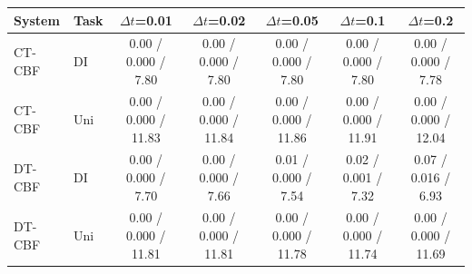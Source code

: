 \begin{tabular}{llccccc}
\hline
System & Task & $\Delta t$=0.01 & $\Delta t$=0.02 & $\Delta t$=0.05 & $\Delta t$=0.1 & $\Delta t$=0.2 \\
\hline
CT-CBF & DI & 0.00 / 0.000 / 7.80 & 0.00 / 0.000 / 7.80 & 0.00 / 0.000 / 7.80 & 0.00 / 0.000 / 7.80 & 0.00 / 0.000 / 7.78 \\
CT-CBF & Uni & 0.00 / 0.000 / 11.83 & 0.00 / 0.000 / 11.84 & 0.00 / 0.000 / 11.86 & 0.00 / 0.000 / 11.91 & 0.00 / 0.000 / 12.04 \\
DT-CBF & DI & 0.00 / 0.000 / 7.70 & 0.00 / 0.000 / 7.66 & 0.01 / 0.000 / 7.54 & 0.02 / 0.001 / 7.32 & 0.07 / 0.016 / 6.93 \\
DT-CBF & Uni & 0.00 / 0.000 / 11.81 & 0.00 / 0.000 / 11.81 & 0.00 / 0.000 / 11.78 & 0.00 / 0.000 / 11.74 & 0.00 / 0.000 / 11.69 \\
\hline
\end{tabular}
